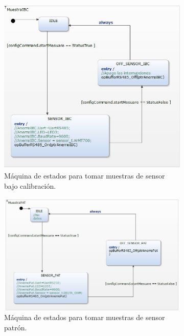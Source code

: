 \begin{figure}[H]
    \centering
    \begin{subfigure}[b]{0.45\textwidth}
        \centering
        \includegraphics[width=1.2\linewidth]{Figuras/datalogger/Firmware/MuestraIBC.jpg}
        \caption{Máquina de estados para tomar muestras de sensor bajo calibración.}
        \label{fig:MuestraIBC}
    \end{subfigure}\hspace{0.09\textwidth}
    \begin{subfigure}[b]{0.45\textwidth}
        \centering
        \includegraphics[width=1.2\linewidth]{Figuras/datalogger/Firmware/MuestraPAT.jpg}
        \caption{Máquina de estados para tomar muestras de sensor patrón.}
        \label{fig:MuestraPAT}
    \end{subfigure}
    \caption{}
    \label{fig:mainFigures}
\end{figure}

